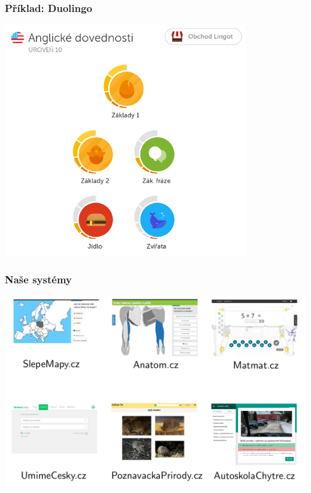 \documentclass[xcolor=svgnames]{beamer}
\begin{document}
\begin{frame}
	\frametitle{Příklad: Duolingo}
	\hspace{0.1\textwidth}
   \includegraphics[width=0.8\textwidth]{img/duolingo-skills}
\end{frame}
\begin{frame}
	\frametitle{Naše systémy}
   \includegraphics[width=\textwidth]{img/system-grid}
\end{frame}
\end{document}
